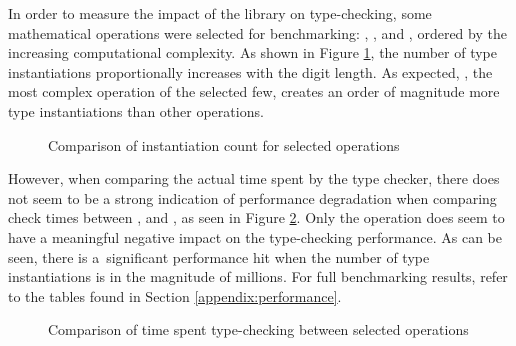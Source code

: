 In order to measure the impact of the library on type-checking, some mathematical operations were selected for benchmarking: , ,  and , ordered by the increasing computational complexity. As shown in Figure \ref{fig:instantiation-count}, the number of type instantiations proportionally increases with the digit length. As expected, , the most complex operation of the selected few, creates an order of magnitude more type instantiations than other operations.

\pagebreak

\begin{figure}[ht]
  \centering
  \resizebox{\textwidth}{!}{}
  \caption{Comparison of instantiation count for selected operations}
  \label{fig:instantiation-count}
\end{figure}

However, when comparing the actual time spent by the type checker, there does not seem to be a strong indication of performance degradation when comparing check times between ,  and , as seen in Figure \ref{fig:check-time}. Only the  operation does seem to have a meaningful negative impact on the type-checking performance. As can be seen, there is a~significant performance hit when the number of type instantiations is in the magnitude of millions. For full benchmarking results, refer to the tables found in Section \ref{appendix:performance}.

\begin{figure}[ht]
  \centering
  \resizebox{\textwidth}{!}{}
  \caption{Comparison of time spent type-checking between selected operations}
  \label{fig:check-time}
\end{figure}

